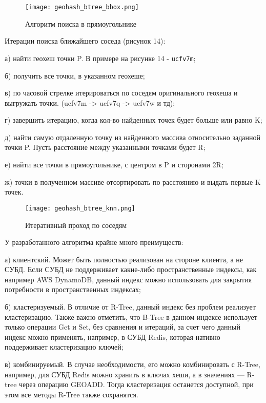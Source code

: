 \par\vspace{1em}
\begin{figure}[H]
    \centering
    \texttt{[image: geohash\_btree\_bbox.png]}
    \caption{Алгоритм поиска в прямоугольнике}
\end{figure}
\par\vspace{1em}
  
Итерации поиска ближайшего соседа (рисунок 14):
\par а) найти геохеш точки P. В примере на рисунке 14 - \texttt{ucfv7m};
\par б) получить все точки, в указанном геохеше;
\par в) по часовой стрелке итерироваться по соседям оригинального геохеша и выгружать точки. (ucfv7m -> ucfv7q -> ucfv7w и тд);
\par г) завершить итерацию, когда кол-во найденных точек будет больше или равно K;
\par д) найти самую отдаленную точку из найденного массива относительно заданной точки P. Пусть расстояние между указанными точками будет R;
\par е) найти все точки в прямоугольнике, с центром в P и сторонами 2R;
\par ж) точки в полученном массиве отсортировать по расстоянию и выдать первые K точек.
  
\par\vspace{1em}
\begin{figure}[H]
    \centering
    \texttt{[image: geohash\_btree\_knn.png]}
    \caption{Итеративный проход по соседям}
\end{figure}
\par\vspace{1em}
  
У разработанного алгоритма крайне много преимуществ:
\par а) клиентский. Может быть полностью реализован на стороне клиента, а не СУБД. Если СУБД не поддерживает какие-либо пространственные индексы, как например AWS DynamoDB, данный индекс можно использовать для закрытия потребности в пространственных индексах;
\par б) кластеризуемый. В отличие от R-Tree, данный индекс без проблем реализует кластеризацию. Также важно отметить, что B-Tree в данном индексе использует только операции Get и Set, без сравнения и итераций, за счет чего данный индекс можно применять, например, в СУБД Redis, которая нативно поддерживает кластеризацию ключей;
\par в) комбинируемый. В случае необходимости, его можно комбинировать с R-Tree, например, для СУБД Redis можно хранить в ключах хеши, а в значениях --- R-tree через операцию GEOADD\cite{redisGeo}. Тогда кластеризация останется доступной, при этом все методы R-Tree также сохранятся. 
    
